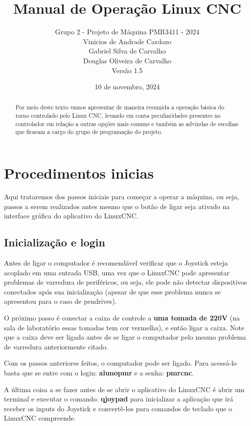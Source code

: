 \documentclass[twoside,a4paper]{refart}
\title{Manual de Operação Linux CNC}
\author{Grupo 2 - Projeto de Máquina PMR3411 - 2024 \\
Vinicios de Andrade Cardozo \\
Gabriel Silva de Carvalho  \\
Douglas Oliveira de Carvalho \\
Versão 1.5}
\date{10 de novembro, 2024}
\begin{document}
\maketitle

\begin{abstract}
Por meio deste texto vamos apresentar de maneira resumida a operação básica do torno controlado pelo Linux CNC, levando em conta peculiaridades presentes no controlador em relação a outras opções mais comuns e também as advindas de escolhas que ficaram a cargo do grupo de programação do projeto.
\end{abstract}

\tableofcontents

\newpage



\section{Procedimentos inicias}

Aqui trataremos dos passos iniciais para começar a operar a máquina, ou seja, passos a serem realizados antes mesmo que o botão de ligar seja ativado na interface gráfica do aplicativo do LinuxCNC. 

\subsection{Inicialização e login}

Antes de ligar o computador é recomendável verificar que o Joystick esteja acoplado em uma entrada USB, uma vez que o LinuxCNC pode apresentar problemas de varredura de periféricos, ou seja, ele pode não detectar dispositivos conectados após sua inicialização (apesar de que esse problema nunca se apresentou para o caso de pendrives).

O próximo passo é conectar a caixa de controle a \textbf{uma tomada de 220V} (na sala de laboratório essas tomadas tem cor vermelha), e então ligar a caixa. Note que a caixa deve ser ligada antes de se ligar o computador pelo mesmo problema de varredura anteriormente citado.

Com os passos anteriores feitos, o computador pode ser ligado. Para acessá-lo basta que se entre com o login: \textbf{alunopmr} e a senha: \textbf{pmrcnc}. 

A última coisa a se fazer antes de se abrir o aplicativo do LinuxCNC é abrir um terminal e executar o comando: \textbf{qjoypad} para inicializar a aplicação que irá receber os inputs do Joystick e convertê-los para comandos de teclado que o LinuxCNC compreende. 
\end{document}
